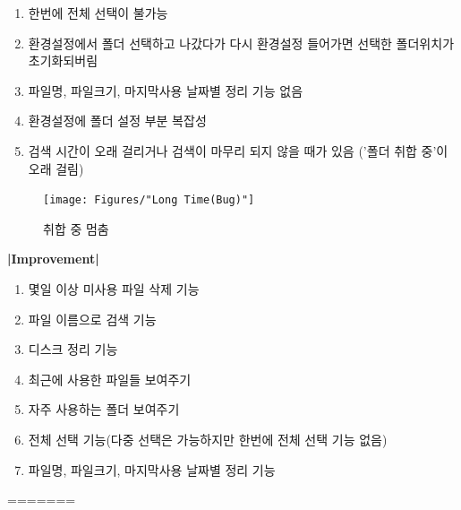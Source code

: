 \documentclass[a4paper, 13pt]{article} %
\begin{document}
		\begin{enumerate}
		\large \item 한번에 전체 선택이 불가능 \newline
		
		\item 환경설정에서 폴더 선택하고 나갔다가 다시 환경설정 들어가면
		선택한 폴더위치가 초기화되버림 \newline
		
		\item 파일명, 파일크기, 마지막사용 날짜별 정리 기능 없음 \newline
		
		\item 환경설정에 폴더 설정 부분 복잡성 \newline
		
		\item 검색 시간이 오래 걸리거나 검색이 마무리 되지 않을 때가 있음
		('폴더 취합 중'이 오래 걸림) \newline \newline
		
	\end{enumerate}
		
		\begin{figure}[h]
			
			\centering
			
			\texttt{[image: Figures/"Long Time(Bug)"]}
			
			\caption{취합 중 멈춤}
			
			\label{fig:long-time}
			
		\end{figure}
		
		\newpage
		
		\bf \LARGE |Improvement| \newline
		
		\begin{enumerate}
		
		\large \item 몇일 이상 미사용 파일 삭제 기능 \newline
		
		\item 파일 이름으로 검색 기능 \newline
		
		\item 디스크 정리 기능 \newline
		
		\item 최근에 사용한 파일들 보여주기 \newline
		
		\item 자주 사용하는 폴더 보여주기 \newline
		
		\item 전체 선택 기능(다중 선택은 가능하지만 한번에 전체 선택 기능 없음) \newline
		
		\item 파일명, 파일크기, 마지막사용 날짜별 정리 기능
		\end{enumerate}
=======
\end{document}
